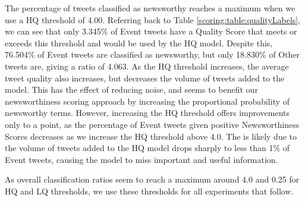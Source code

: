 The percentage of tweets classified as newsworthy reaches a maximum when we use a HQ threshold of 4.00.
Referring back to Table \ref{scoring:table:qualityLabels}, we can see that only 3.345\% of Event tweets have a Quality Score that meets or exceeds this threshold and would be used by the HQ model.
Despite this, 76.504\% of Event tweets are classified as newsworthy, but only 18.830\% of Other tweets are, giving a ratio of 4.063.
As the HQ threshold increases, the average tweet quality also increases, but decreases the volume of tweets added to the model.
This has the effect of reducing noise, and seems to benefit our newsworthiness scoring approach by increasing the proportional probability of newsworthy terms.
However, increasing the HQ threshold offers improvements only to a point, as the percentage of Event tweets given positive Newsworthiness Scores decreases as we increase the HQ threshold above 4.0.
The is likely due to the volume of tweets added to the HQ model drops sharply to less than 1\% of Event tweets, causing the model to miss important and useful information.

As overall classification ratios seem to reach a maximum around 4.0 and 0.25 for HQ and LQ thresholds, we use these thresholds for all experiments that follow.

